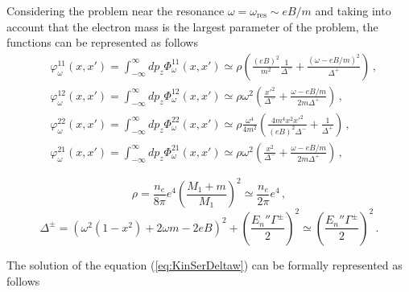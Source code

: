 \documentclass[
aps,%
12pt,%
final,%
notitlepage,%
oneside,%
onecolumn,%
nobibnotes,%
nofootinbib,%
superscriptaddress,%
noshowpacs,%
centertags]%
{revtex4}
\begin{document}
Considering the problem near the resonance $\omega=\omega_\text{res}\sim eB/m$ and taking into account that the electron mass is the largest parameter of the problem, the functions can be represented as follows
\begin{equation}
\begin{aligned}
&\varphi_\omega^{11}(x,x')=\int_{-\infty}^{\infty}dp_z\Phi_\omega^{11}(x,x')\simeq \rho \left(\frac{(eB)^2}{m^2}\frac{1}{\Delta^-} +\frac{(\omega - eB/m)^2}{\Delta^+}\right)\, ,
\\
&\varphi_\omega^{12}(x,x')=\int_{-\infty}^{\infty}dp_z\Phi_\omega^{12}(x,x')\simeq \rho \omega^2 \left(
\frac{x'^2}{\Delta^-} + \frac{\omega - eB/m}{2m \Delta^+}
\right)	\, ,
\\
&
\varphi_\omega^{22}(x,x')=\int_{-\infty}^{\infty}dp_z\Phi_\omega^{22}(x,x')\simeq \rho \frac{\omega^4}{4m^2}
\left(
\frac{4m^4x^2 x'^2 }{(eB)^2 \Delta^-} + \frac{1}{\Delta^+}
\right)\, ,
\\
&
\varphi_\omega^{21}(x,x')=\int_{-\infty}^{\infty}dp_z\Phi_\omega^{21}(x,x')\simeq \rho \omega^2
\left(
\frac{x^2}{\Delta^-} + \frac{\omega - eB/m}{2m \Delta^+}
\right)\, ,
\end{aligned}
\end{equation}

\begin{equation}
\rho = \frac{n_e}{8\pi} e^4 \left(\frac{M_1 + m}{M_1}\right)^2\simeq \frac{n_e}{2\pi}e^4\, ,
\end{equation}
\begin{equation}
\Delta^\pm = (\omega^2(1-x^2)+2 \omega m - 2eB)^2 + \left(\frac{E_n{''} \Gamma^\pm}{2}\right)^2\simeq \left(\frac{E_n{''} \Gamma^\pm}{2}\right)^2 \, .
\end{equation}

The solution of the equation (\ref{eq:KinSerDeltaw}) can be formally represented as follows 
\end{document}
